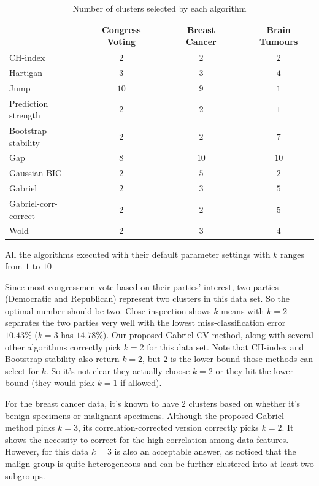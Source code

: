 \documentclass[12pt]{article}
\begin{document}
\begin{table}[H]
\begin{center}
\captionsetup{justification=centering}
\caption{\label{table2} Number of clusters selected by each algorithm}
\begin{tabular}{lccccc}
    \hline                  
 & Congress Voting && Breast Cancer && Brain Tumours \\ \hline                    
CH-index & $2$ && $2$  && $2$    \\
Hartigan & $3$ && $3$  &&  $4$   \\
Jump & $10$ && $9$ && $1$  \\   
Prediction strength & $2$ &&  $2$ && $1$    \\
Bootstrap stability & $2$ &&  $2$ &&  $7$   \\ 
Gap & $8$ && $10$ && $10$  \\   
Gaussian-BIC & $2$ && $5$ && $2$  \\   
Gabriel & $2$  && $3$  && $5$  \\    
Gabriel-corr-correct & $2$  && $2$  && $5$  \\  
Wold & $2$ && $3$ && $4$ \\  \hline 

\end{tabular}
\end{center}
\hspace{0.5in} \footnotesize {All the algorithms executed with their default parameter settings with $k$ ranges from $1$ to $10$}
\end{table} 

Since most congressmen vote based on their parties' interest, two parties
(Democratic and Republican) represent two clusters in this data set. So the
optimal number should be two. Close inspection shows $k$-means with
$k=2$ separates the two parties very well with the lowest miss-classification
error $10.43\%$ ($k=3$ has $14.78\%$). Our proposed Gabriel CV method, along with 
several other algorithms correctly pick $k=2$ for this data set. Note that CH-index and Bootstrap
stability also return $k=2$, but $2$ is the lower bound those methods can
select for $k$. So it's not clear they actually choose $k=2$ or they hit the
lower bound (they would pick $k=1$ if allowed). 

For the breast cancer data, it's known to have $2$ clusters based on 
whether it's benign specimens or malignant specimens. Although the proposed Gabriel method
picks $k=3$, its correlation-corrected version correctly picks $k=2$. It shows the necessity 
to correct for the high correlation among data features. However, for this data $k=3$ is also
an acceptable answer, as \cite{fujita2014non} noticed that the malign group is quite heterogeneous and
can be further clustered into at least two subgroups.
\end{document}
